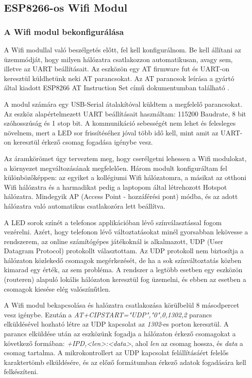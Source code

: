 \documentclass[../main.tex]{subfiles}
\begin{document}
    \subsection{ESP8266-os Wifi Modul}
        \subsubsection{A Wifi modul bekonfigurálása}
            A Wifi modullal való beszélgetés előtt, fel kell konfigurálnom. Be kell állítani az üzemmódját, hogy milyen hálózatra csatlakozzon automatikusan, avagy sem, illetve az UART beállításait. Az eszközön egy AT firmware fut és UART-on keresztül küldhetünk neki AT parancsokat. Az AT parancsok leírása a gyártó által kiadott ESP8266 AT Instruction Set című dokumentumban található \cite{esp_at_inst_set}.
            
            A modul számára egy USB-Serial átalakítóval küldtem a megfelelő parancsokat. Az eszköz alapértelmezett UART beállításait használtam: 115200 Baudrate, 8 bit szóhosszúság és 1 stop bit. A kommunikáció sebességét nem lehet és felesleges növelnem, mert a LED sor frissítéséhez jóval több idő kell, mint amit az UART-on keresztül érkező csomag fogadása igénybe vesz.
            
            Az áramkörömet úgy terveztem meg, hogy cserélgetni lehessen a Wifi modulokat, a környezet megváltozásának megfelelően. Három modult konfiguráltam fel különbözőképpen: az egyiket a kollégiumi Wifi hálózatomra, a másikat az otthoni Wifi hálózatra és a harmadikat pedig a laptopom által létrehozott Hotspot hálózatra. Mindegyik AP (Access Point - hozzáférési pont) módba, és az adott hálózatra való automatikus csatlakozóra lett beállítva.
            
            A LED sorok színét a telefonos applikációban lévő színválasztással fogom vezérelni. Azért, hogy telefonon lévő változtatásokat minél gyorsabban lekövesse a rendszerem, az online számítógépes játékoknál is alkalmazott, UDP (User Datagram Protocol) protokollt választottam. Az UDP protokoll nem biztosítja a hálózaton közlekedő csomagok megérkezését, de ha a sok színváltoztatás közben kimarad egy érték, az sem probléma. A rendszer a legtöbb esetben egy eszközön (routeren) alapuló lokális hálózaton keresztül fog üzemelni, és ebben az esetben a csomagok kiesése elég valószínűtlen.
            
            A Wifi modul bekapcsolása és halózatra csatlakozása körülbelül 8 másodpercet vesz igénybe. Ezután a \textit{AT+CIPSTART="UDP","0",0,1302,2} parancs elküldésével hozható létre az UDP kapcsolat az \textit{1302}-es porton keresztül. A parancs elküldése után az eszközünk fogadja a hálózaton érkező csomagokat a következő formában: \textit{+IPD,<len>:<data>}, ahol \textit{len} az csomag hossza, és \textit{data} a csomag tartalma. A mikrokontrollert az UDP kapcsolat felállításáért felelős karaktertömb elküldésére, és az előző formátumban érkező adatok fogadására kell felkészíteni. 
        
\end{document}
